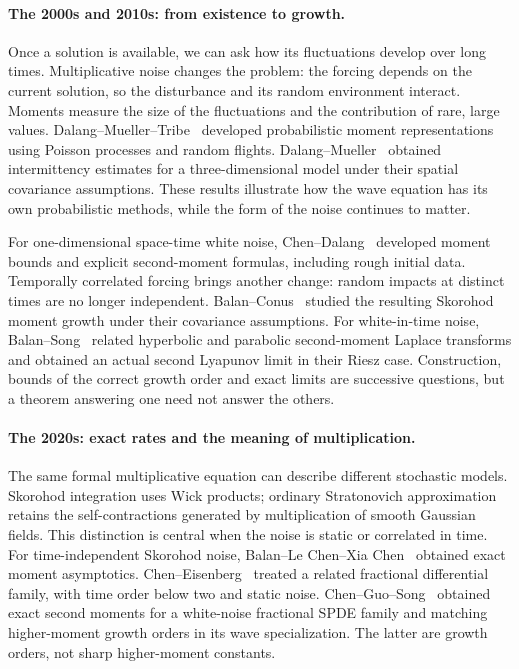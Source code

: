 \paragraph{The 2000s and 2010s: from existence to growth.}
Once a solution is available, we can ask how its fluctuations develop over long
times. Multiplicative noise changes the problem: the forcing depends on the
current solution, so the disturbance and its random environment interact.
Moments measure the size of the fluctuations and the contribution of rare, large
values. Dalang--Mueller--Tribe~\cite{dalang.mueller.ea:08:feynman-kac-type}
developed probabilistic moment representations using Poisson processes and
random flights. Dalang--Mueller~\cite{dalang.mueller:09:intermittency} obtained
intermittency estimates for a three-dimensional model under their spatial
covariance assumptions. These results illustrate how the wave equation has its
own probabilistic methods, while the form of the noise continues to matter.

For one-dimensional space-time white noise,
Chen--Dalang~\cite{chen.dalang:15:moment} developed moment bounds and explicit
second-moment formulas, including rough initial data. Temporally correlated
forcing brings another change: random impacts at distinct times are no longer
independent. Balan--Conus~\cite{balan.conus:16:intermittency} studied the
resulting Skorohod moment growth under their covariance assumptions. For
white-in-time noise, Balan--Song~\cite{balan.song:19:second} related hyperbolic
and parabolic second-moment Laplace transforms and obtained an actual second
Lyapunov limit in their Riesz case. Construction, bounds of the correct growth
order and exact limits are successive questions, but a theorem answering one
need not answer the others.

\paragraph{The 2020s: exact rates and the meaning of multiplication.}
The same formal multiplicative equation can describe different stochastic
models. Skorohod integration uses Wick products; ordinary Stratonovich
approximation retains the self-contractions generated by multiplication of
smooth Gaussian fields. This distinction is central when the noise is static or
correlated in time. For time-independent Skorohod noise, Balan--Le Chen--Xia
Chen~\cite{balan.chen.ea:22:exact} obtained exact moment asymptotics.
Chen--Eisenberg~\cite{chen.eisenberg:23:interpolating} treated a related
fractional differential family, with time order below two and static noise.
Chen--Guo--Song~\cite{chen.guo.ea:24:moments} obtained exact second moments for
a white-noise fractional SPDE family and matching higher-moment growth orders in
its wave specialization. The latter are growth orders, not sharp higher-moment
constants.


